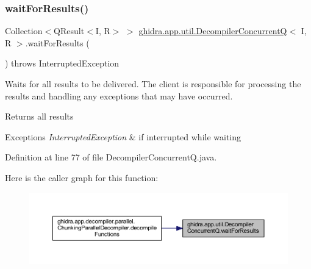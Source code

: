 \subsubsection{\texorpdfstring{waitForResults()}{waitForResults()}}
{\footnotesize\ttfamily Collection$<$Q\+Result$<$I, R$>$ $>$ \mbox{\hyperlink{classghidra_1_1app_1_1util_1_1_decompiler_concurrent_q}{ghidra.\+app.\+util.\+Decompiler\+ConcurrentQ}}$<$ I, R $>$.wait\+For\+Results (\begin{DoxyParamCaption}{ }\end{DoxyParamCaption}) throws Interrupted\+Exception\hspace{0.3cm}{\ttfamily [inline]}}

Waits for all results to be delivered. The client is responsible for processing the results and handling any exceptions that may have occurred.

\begin{DoxyReturn}{Returns}
all results 
\end{DoxyReturn}

\begin{DoxyExceptions}{Exceptions}
{\em Interrupted\+Exception} & if interrupted while waiting \\
\hline
\end{DoxyExceptions}


Definition at line 77 of file Decompiler\+Concurrent\+Q.\+java.

Here is the caller graph for this function\+:
\nopagebreak
\begin{figure}[H]
\begin{center}
\leavevmode
\includegraphics[width=350pt]{classghidra_1_1app_1_1util_1_1_decompiler_concurrent_q_acf02756d2c1b9ab17c3871870601f76e_icgraph}
\end{center}
\end{figure}
\mbox{\label{classghidra_1_1app_1_1util_1_1_decompiler_concurrent_q_a747c39c68ede4a3560e4b2e18a15905a}} 
